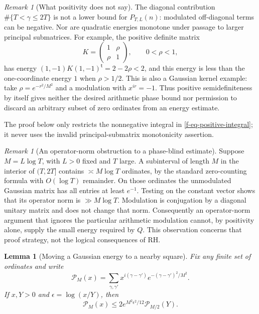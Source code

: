 \documentclass[11pt,a4paper]{article}
\newtheorem{lemma}[theorem]{Lemma}
\theoremstyle{definition}
\theoremstyle{remark}
\newtheorem{remark}[theorem]{Remark}
\begin{document}
\begin{remark}[What positivity does not say]
\label{f-rem-psd-limitations}
The diagonal contribution $\#\{T<\gamma\le2T\}$ is not a lower bound for
$P_{T,L}(n)$: modulated off-diagonal terms can be negative.  Nor are
quadratic energies monotone under passage to larger principal submatrices.
For example, the positive definite matrix
\[
 K=\begin{pmatrix}1&\rho\\\rho&1\end{pmatrix},\qquad 0<\rho<1,
\]
has energy $(1,-1)K(1,-1)^{\mathsf t}=2-2\rho<2$, and this energy is less
than the one-coordinate energy $1$ when $\rho>1/2$.  This is also a Gaussian
kernel example: take $\rho=e^{-r^2/M^2}$ and a modulation with
$x^{ir}=-1$.  Thus positive semidefiniteness by itself gives neither the
desired arithmetic phase bound nor permission to discard an arbitrary
subset of zero ordinates from an energy estimate.

The proof below only restricts the nonnegative integral in
\eqref{f-eq-positive-integral}; it never uses the invalid principal-submatrix
monotonicity assertion.
\end{remark}

\begin{remark}[An operator-norm obstruction to a phase-blind estimate]
\label{f-rem-operator-norm}
Suppose $M=L\log T$, with $L>0$ fixed and $T$ large.  A subinterval of
length $M$ in the interior of $(T,2T]$ contains $\asymp M\log T$ ordinates,
by the standard zero-counting formula with $O(\log T)$ remainder.  On those
ordinates the unmodulated Gaussian matrix has all entries at least $e^{-1}$.
Testing on the constant vector shows that its operator norm is
$\gg M\log T$.  Modulation is conjugation by a diagonal unitary matrix and
does not change that norm.  Consequently an operator-norm argument that
ignores the particular arithmetic modulation cannot, by positivity alone,
supply the small energy required by $Q$.  This observation concerns that
proof strategy, not the logical consequences of RH.
\end{remark}

\begin{lemma}[Moving a Gaussian energy to a nearby square]
\label{f-lem-square-centre}
Fix any finite set of ordinates and write
\[
 \mathcal P_M(x)=\sum_{\gamma,\gamma'}
 x^{i(\gamma-\gamma')}e^{-(\gamma-\gamma')^2/M^2}.
\]
If $x,Y>0$ and $\epsilon=\log(x/Y)$, then
\begin{equation}
 \mathcal P_M(x)\le
 2e^{M^2\epsilon^2/12}\mathcal P_{M/2}(Y).
 \label{f-eq-square-comparison}
\end{equation}
\end{lemma}
\end{document}
